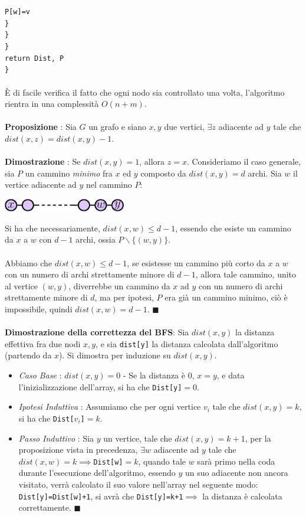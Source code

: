 \documentclass[12pt, letterpaper]{article}
\newcommand{\codee}[1]{\colorbox{white}{\texttt{#1}}}
\newcommand{\acc}{\\\hphantom{}\\}
\begin{document}
\hphantom{ident}\hphantom{ident}\hphantom{ident}\hphantom{ident}\codee{P[w]=v}\\
\hphantom{ident}\hphantom{ident}\hphantom{ident}\codee{\}}\\
\hphantom{ident}\hphantom{ident}\codee{\}}\\
\hphantom{ident}\codee{\}}\\
\hphantom{ident}\codee{return Dist, P}\\
\codee{\}}\acc
È di facile verifica il fatto che ogni nodo sia controllato una volta, l'algoritmo rientra in una complessità $O(n+m)$.\acc
\textbf{Proposizione }: Sia $G$ un grafo e siano $x,y$ due vertici, $\exists z $ adiacente ad $y$ tale che
$dist(x,z)=dist(x,y)-1$.\acc
\textbf{Dimostrazione }: Se $dist(x,y)=1$, allora $z=x$. Consideriamo il caso generale, sia $P$ un cammino
\textit{minimo} fra $x$ ed $y$ composto da $dist(x,y)=d$ archi. Sia $w$ il vertice adiacente ad $y$ nel cammino $P$:
\begin{center}
    \includegraphics[width=0.4\textwidth ]{images/xvy.eps}
\end{center}
Si ha che necessariamente, $dist(x,w)\le d-1$, essendo che esiste un cammino da $x$ a $w$ con $d-1$ archi,
ossia $P\backslash \{(w,y)\}$.\acc
Abbiamo che  $dist(x,w)\le d-1$, se esistesse un cammino più corto da $x$ a $w$ con un numero di archi strettamente
minore di $d-1$, allora tale cammino, unito al vertice $(w,y)$, diverrebbe un cammino da $x$ ad $y$ con un numero di
archi strettamente minore di $d$, ma per ipotesi, $P$ era già un cammino minimo, ciò è impossibile, quindi
$dist(x,w)=d-1$. $\blacksquare$\acc
\textbf{Dimostrazione della correttezza del BFS}: Sia $dist(x,y)$ la distanza effettiva fra due nodi $x,y$, e sia
\codee{dist[y]} la distanza calcolata dall'algoritmo (partendo da $x$). Si dimostra per induzione su $dist(x,y)$.\begin{itemize}
    \item \textit{Caso Base} : $dist(x,y)=0$ - Se la distanza è $0$, $x=y$, e data l'inizializzazione dell'array, si ha che
          \codee{Dist[y]}$=0$.
    \item \textit{Ipotesi Induttiva} : Assumiamo che per ogni vertice $v_i$ tale che $dist(x,y)=k$, si ha che \codee{Dist[$v_i$]}$=k$.
    \item \textit{Passo Induttivo} : Sia $y$ un vertice, tale che $dist(x,y)=k+1$, per la proposizione vista in precedenza,
          $\exists w$ adiacente ad $y$ tale che $dist(x,w)=k\implies$\codee{Dist[w]}$=k$, quando tale $w$ sarà primo nella coda
          durante l'esecuzione dell'algoritmo, essendo $y$ un suo adiacente non ancora visitato, verrà calcolato il suo
          valore nell'array nel seguente modo: \codee{Dist[y]=Dist[w]+1}, si avrà che \codee{Dist[y]=k+1}$\implies$ la distanza è
          calcolata correttamente. $\blacksquare$
\end{itemize}
\end{document}
